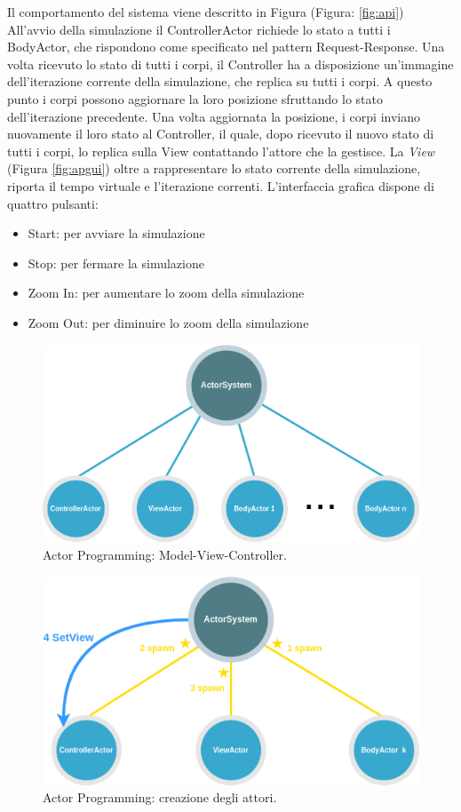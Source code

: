 \documentclass[12pt,a4paper,openright,twoside]{book}
\begin{document}
Il comportamento del sistema viene descritto in Figura (Figura: \ref{fig:api})
All'avvio della simulazione il ControllerActor richiede lo stato a tutti i BodyActor, che rispondono come specificato nel pattern Request-Response. Una volta ricevuto lo stato di tutti i corpi, il Controller ha a disposizione un'immagine dell'iterazione corrente della simulazione, che replica su tutti i corpi. A questo punto i corpi possono aggiornare la loro posizione sfruttando lo stato dell'iterazione precedente.
Una volta aggiornata la posizione, i corpi inviano nuovamente il loro stato al Controller, il quale, dopo ricevuto il nuovo stato di tutti i corpi, lo replica sulla View contattando l'attore che la gestisce.
La \textit{View} (Figura \ref{fig:apgui}) oltre a rappresentare lo stato corrente della simulazione, riporta il tempo virtuale e l'iterazione correnti.
L'interfaccia grafica dispone di quattro pulsanti:
\begin{itemize}
    \item Start: per avviare la simulazione
    \item Stop: per fermare la simulazione
    \item Zoom In: per aumentare lo zoom della simulazione
    \item Zoom Out: per diminuire lo zoom della simulazione
\end{itemize}
\begin{figure}[H]
	\centering
	\includegraphics[width=\textwidth]{figures/actor-programming-mvc.png}
	\caption{Actor Programming: Model-View-Controller.}
	\label{fig:apmvc}
\end{figure}
\begin{figure}[H]
	\centering
	\includegraphics[width=\textwidth]{figures/actor-programming-creation.png}
	\caption{Actor Programming: creazione degli attori.}
	\label{fig:apc}
\end{figure}
\end{document}
